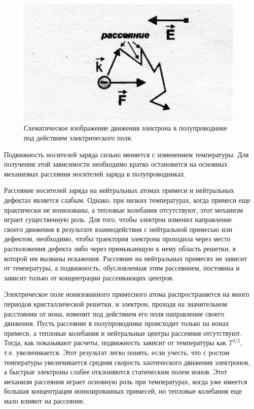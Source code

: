 \begin{figure}[h!]
	\centering
	\includegraphics[width = .5\linewidth]{img/31.jpg}
	\caption{Схематическое изображение движения электрона в полупроводнике под действием электрического поля.}
	\label{fig:3.1}
\end{figure}

Подвижность носителей заряда сильно меняется с изменением температуры. Для получения этой зависимости необходимо кратко
остановится на основных механизмах рассеяния носителей заряда в полупроводниках. 

Рассеяние носителей заряда на нейтральных атомах примеси и нейтральных дефектах является слабым. Однако, при низких
температурах, когда примеси еще практически не ионизованы, а тепловые колебания отсутствуют, этот механизм играет
существенную роль. Для того, чтобы электрон изменил направление своего движения в результате взаимодействия с
нейтральной примесью или дефектом, необходимо, чтобы траектория электрона проходила через место расположения дефекта
либо через примыкающую к нему область решетки, в которой им вызваны искажения. Рассеяние на нейтральных примесях не
зависит от температуры, а подвижность, обусловленная этим рассеянием, постоянна и зависит только от концентрации
рассеивающих центров.

Электрическое поле ионизованного примесного атома распространяется на много периодов кристаллической решетки, и
электрон, проходя на значительном расстоянии от иона, изменит под действием его поля направление своего движения. Пусть
рассеяние в полупроводнике происходит только на ионах примеси, а тепловые колебания и нейтральные центры рассеяния
отсутствуют. Тогда, как показывают расчеты, подвижность зависит от температуры как $T^{3/2}$, т.е. увеличивается. Этот
результат легко понять, если учесть, что с ростом температуры увеличивается средняя скорость хаотического движения
электронов, а быстрые электроны слабее отклоняются статическим полем ионов. Этот механизм рассеяния играет основную роль
при температурах, когда уже имеется большая концентрация ионизированных примесей, но тепловые колебания еще мало влияют
на рассеяние. 

